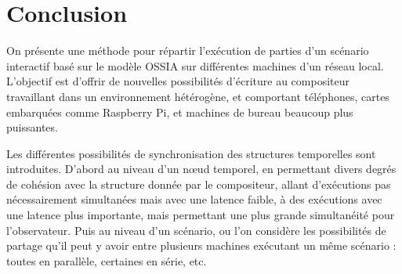 \documentclass[10pt]{article}
\newcommand\ossia{OSSIA\xspace}
\begin{document}










\section{Conclusion}
On présente une méthode pour répartir l'exécution de parties d'un scénario interactif basé sur le modèle \ossia sur différentes machines d'un réseau local. 
L'objectif est d'offrir de nouvelles possibilités d'écriture au compositeur travaillant dans un environnement hétérogène, et comportant téléphones, cartes embarquées comme Raspberry Pi, et machines de bureau beaucoup plus puissantes.

Les différentes possibilités de synchronisation des structures temporelles sont introduites. 
D'abord au niveau d'un nœud temporel, en permettant divers degrés de cohésion avec la structure donnée par le compositeur, allant d'exécutions pas nécessairement simultanées mais avec une latence faible, à des exécutions avec une latence plus importante, mais permettant une plus grande simultanéité pour l'observateur.
Puis au niveau d'un scénario, ou l'on considère les possibilités de partage qu'il peut y avoir entre plusieurs machines exécutant un même scénario : toutes en parallèle, certaines en série, etc.
\end{document}
